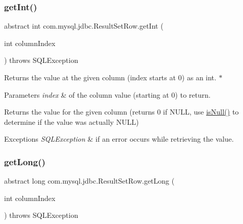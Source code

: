 \subsubsection{\texorpdfstring{get\+Int()}{getInt()}}
{\footnotesize\ttfamily abstract int com.\+mysql.\+jdbc.\+Result\+Set\+Row.\+get\+Int (\begin{DoxyParamCaption}\item[{int}]{column\+Index }\end{DoxyParamCaption}) throws S\+Q\+L\+Exception\hspace{0.3cm}{\ttfamily [abstract]}}

Returns the value at the given column (index starts at 0) as an int. $\ast$


\begin{DoxyParams}{Parameters}
{\em index} & of the column value (starting at 0) to return. \\
\hline
\end{DoxyParams}
\begin{DoxyReturn}{Returns}
the value for the given column (returns 0 if N\+U\+LL, use \mbox{\hyperlink{classcom_1_1mysql_1_1jdbc_1_1_result_set_row_a96243f8e7eb839c4c233a2e4aa1cfb6b}{is\+Null()}} to determine if the value was actually N\+U\+LL) 
\end{DoxyReturn}

\begin{DoxyExceptions}{Exceptions}
{\em S\+Q\+L\+Exception} & if an error occurs while retrieving the value. \\
\hline
\end{DoxyExceptions}
\mbox{\label{classcom_1_1mysql_1_1jdbc_1_1_result_set_row_abe8370eba2fb621aa7523763fc8ef3c6}} 
\subsubsection{\texorpdfstring{get\+Long()}{getLong()}}
{\footnotesize\ttfamily abstract long com.\+mysql.\+jdbc.\+Result\+Set\+Row.\+get\+Long (\begin{DoxyParamCaption}\item[{int}]{column\+Index }\end{DoxyParamCaption}) throws S\+Q\+L\+Exception\hspace{0.3cm}{\ttfamily [abstract]}}

